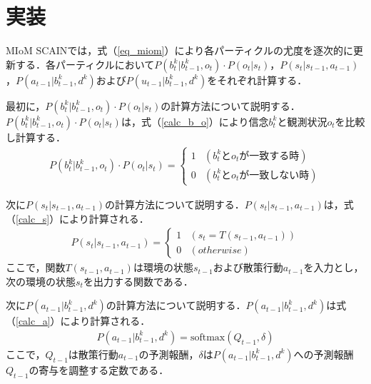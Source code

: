 \section{実装}
\par
MIoM SCAINでは，式（\ref{eq_miom}）により各パーティクルの尤度を逐次的に更新する．各パーティクルにおいて$P(b_t^k|b_{t-1}^k,o_t)\cdot P(o_t|s_t)$，$P(s_t|s_{t-1},a_{t-1})$，$P(a_{t-1}|b_{t-1}^k,d^k)$および$P(u_{t-1}|b_{t-1}^k,d^k)$をそれぞれ計算する．

\par
最初に，$P(b_t^k|b_{t-1}^k,o_t)\cdot P(o_t|s_t)$の計算方法について説明する．$P(b_t^k|b_{t-1}^k,o_t)\cdot P(o_t|s_t)$は，式（\ref{calc_b_o}）により信念$b_t^k$と観測状況$o_t$を比較し計算する．
\begin{equation}
  \begin{split}
  \label{calc_b_o}
  P(b_t^k|b_{t-1}^k,o_t)\cdot P(o_t|s_t)=
  \begin{cases}
    1 & (b_t^kとo_tが一致する時) \\
    0 & (b_t^kとo_tが一致しない時)
  \end{cases}
  \end{split}
\end{equation}

\par
次に$P(s_t|s_{t-1},a_{t-1})$の計算方法について説明する．$P(s_t|s_{t-1},a_{t-1})$は，式（\ref{calc_s}）により計算される．
\begin{equation}
  \begin{split}
  \label{calc_s}
  P(s_t|s_{t-1},a_{t-1})=
  \begin{cases}
    1 & (s_t=T(s_{t-1},a_{t-1})) \\
    0 & (otherwise)
  \end{cases}
  \end{split}
\end{equation}
ここで，関数$T(s_{t-1},a_{t-1})$は環境の状態$s_{t-1}$および散策行動$a_{t-1}$を入力とし，次の環境の状態$s_t$を出力する関数である．

\par
次に$P(a_{t-1}|b_{t-1}^k,d^k)$の計算方法について説明する．$P(a_{t-1}|b_{t-1}^k,d^k)$は式（\ref{calc_a}）により計算される．
\begin{equation}
  \begin{split}
  \label{calc_a}
  P(a_{t-1}|b_{t-1}^k,d^k)=\mathrm{softmax}(Q_{t-1},\delta)
  \end{split}
\end{equation}
ここで，$Q_{t-1}$は散策行動$a_{t-1}$の予測報酬，$\delta$は$P(a_{t-1}|b_{t-1}^k,d^k)$への予測報酬$Q_{t-1}$の寄与を調整する定数である．

